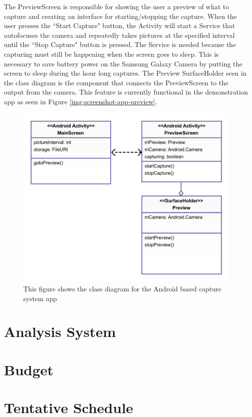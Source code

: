 \documentclass[]{article}
\begin{document}
					The PreviewScreen is responsible for showing the user a preview of what to capture and creating an interface for starting/stopping the capture. When the user presses the ``Start Capture" button, the Activity will start a Service that autofocuses the camera and repeatedly takes pictures at the specified interval until the ``Stop Capture" button is pressed. The Service is needed because the capturing must still be happening when the screen goes to sleep. This is necessary to save battery power on the Samsung Galaxy Camera by putting the screen to sleep during the hour long captures. The Preview SurfaceHolder seen in the class diagram is the component that connects the PreviewScreen to the output from the camera. This feature is currently functional in the demonstration app as seen in Figure \ref{img:screenshot-app-preview}. 
					
					\begin{figure}
						\centering
						\includegraphics[scale=0.3]{images/uml-capture-system.pdf}
						\caption{This figure shows the class diagram for the Android based capture system app}
						\label{img:uml-capture-system}
					\end{figure}
					
					
		
	
	\section{Analysis System}
	
	
	\section{Budget}
	
	
	\section{Tentative Schedule}
		
		
		
			
\end{document}
